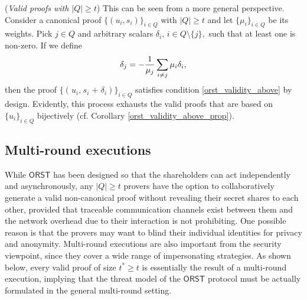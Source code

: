 \documentclass{iacrtrans}
\begin{document}
\begin{rem}\label{orst_valid_above_rem}
(\textit{Valid proofs with $|Q| \ge t$})
This can be seen from a more general perspective.
Consider a canonical proof $\{(u_i, s_i)\}_{i \in Q}$
with $|Q| \ge t$ and let $\{\mu_i\}_{i \in Q}$ be its weights.
Pick $j \in Q$ and arbitrary scalars
$\delta_i,\hspace{2pt} i \in Q \setminus \{j\},$
such that at least one is non-zero.
If we define
\vspace{5pt}
\begin{equation*}
\delta_j = - \frac{1}{\mu_j}
\sum_{i \neq j} \mu_i \delta_i,
\vspace{5pt}
\end{equation*}
then the proof $
	\{
		(
			\hspace{1pt}
			u_i,
			\hspace{1pt}
			s_i
			\hspace{1pt}
			+
			\hspace{1pt}
			\delta_i
		)
	\}_{i \in Q}$
satisfies condition \eqref{orst_validity_above}
by design. Evidently, this process exhausts the valid proofs
that are based on $\{u_i\}_{i \in Q}$ bijectively
(cf. Corollary \ref{orst_validity_above_prop}).
\end{rem}

\subsection{Multi-round executions}\label{section_multi_round}

While $\mathsf{ORST}$ has been designed so that
the shareholders can act independently and asynchronously,
any $|Q| \ge t$ provers have the option to collaboratively
generate a valid non-canonical proof without
revealing their secret shares to each other,
provided that traceable communication channels
exist between them and the network overhead
due to their interaction is not prohibiting.
One possible reason is that the provers
may want to blind their individual identities
for privacy and anonymity.
Multi-round executions are also important from the security viewpoint,
since they cover a wide range of impersonating strategies.
As shown below, every valid proof of size $t^* \ge t$
is essentially the result of a multi-round execution,
implying that the threat model of the $\mathsf{ORST}$
protocol must be actually formulated in the general multi-round setting.
\end{document}
